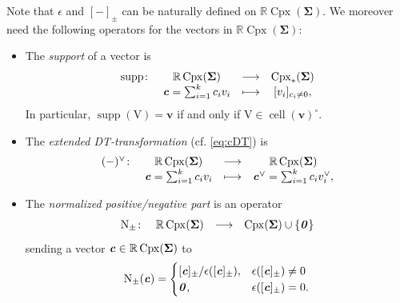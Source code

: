 \documentclass[11pt,reqno]{amsart}
\theoremstyle{plain}
\theoremstyle{definition}
\numberwithin{equation}{section}
\newcommand\RR{\mathbb{R}}
\newcommand\<{\langle}
\renewcommand\>{\rangle}
\newcommand{\on}[1]{\operatorname{#1}}
\def\CCx{\on{Cpx}}   %
\def\cc{\on{cell}}  %
\def\vv{\mathbf{v}}
\newcommand{\ccpt}[1]{\mathrm{#1}}%
\newcommand{\bfit}[1]{\textbf{\textit{#1}}}
\def\seeds{\mathbf{\Sigma}}
\def\cvec{\bfit{c}}
\def\supp{\on{supp}}
\newcommand{\DT}[1]{#1^{\vee}}
\def\sCpx{\RR\CCx}
\def\dCpx{\overrightarrow{\CCx}}
\def\normal{\on{N}}
\def\csum{\epsilon}
\begin{document}
Note that $\csum$ and $[-]_\pm$ can be naturally defined on $\sCpx(\seeds)$. 
We moreover need the following operators for the vectors in $\sCpx(\seeds)$:
\begin{itemize}
    \item The \emph{support} of a vector is 
    \begin{gather}\label{eq:supp}
    \begin{array}{rccc}
    \supp\colon
    & \sCpx(\seeds) & \longrightarrow & \CCx_*(\seeds)  \\
    & \cvec=\sum_{i=1}^k c_i v_i & \longmapsto & [v_i]_{c_i\ne0},
    \end{array}
    \end{gather}
    In particular, $\supp(\ccpt{V})=\vv$ if and only if $\ccpt{V}\in\cc(\vv)^\circ$.

    \item The \emph{extended DT-transformation} (cf. \eqref{eq:cDT}) is 
    \begin{gather}\label{eq:extendDT}
    \begin{array}{rccc}
    \DT{(-)}\colon
    & \sCpx(\seeds) & \longrightarrow & \sCpx(\seeds)  \\
    & \cvec=\sum_{i=1}^k c_i v_i & \longmapsto & \DT{\cvec}=\sum_{i=1}^k c_i \DT{v_i},
    \end{array}
    \end{gather}

    \item The \emph{normalized positive/negative part} is an operator
    \begin{gather}\label{eq:op-normal}
    \begin{array}{rccc}
    \normal_\pm\colon
    & \sCpx(\seeds) & \longrightarrow & \CCx(\seeds)\cup\{\bfit{0}\}
    \end{array}
    \end{gather}
    sending a vector $\cvec\in\sCpx(\seeds)$ to
    \begin{equation}\label{eq:normal}
        \normal_\pm(\cvec)=
        \begin{cases}
            [\cvec]_\pm/\csum([\cvec]_\pm),
            &\csum([\cvec]_\pm)\ne0\\
            \bfit{0},
            &\csum([\cvec]_\pm)=0.
        \end{cases}
    \end{equation}
\end{itemize}
\end{document}
